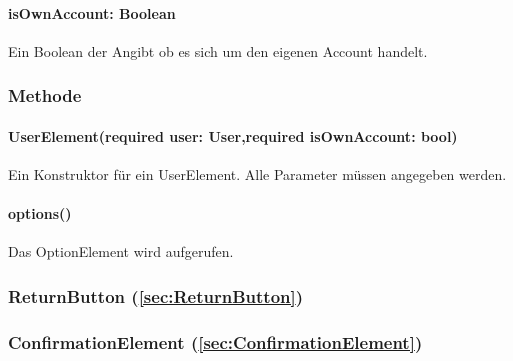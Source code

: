 \documentclass{entwurfsheft}
\begin{document}
\paragraph*{isOwnAccount: Boolean} Ein Boolean der Angibt ob es sich um den eigenen Account handelt.

\subsubsection*{Methode}
\paragraph*{UserElement(required user: User,required isOwnAccount: bool)} Ein Konstruktor für ein UserElement. Alle Parameter müssen angegeben werden.
\paragraph*{options()} Das OptionElement wird aufgerufen.

\subsubsection*{ReturnButton (\ref{sec:ReturnButton})}

\subsubsection*{ConfirmationElement (\ref{sec:ConfirmationElement})}
\end{document}
